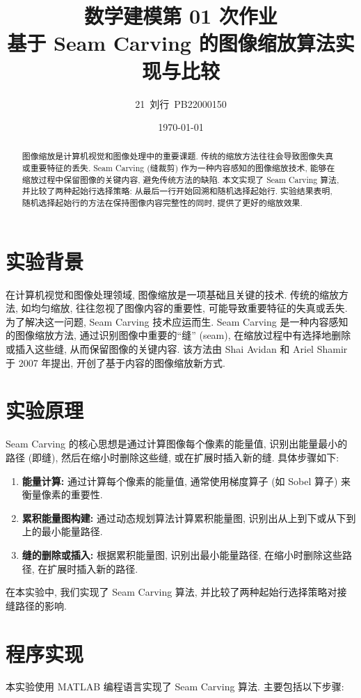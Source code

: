 \documentclass[12pt]{article}
\title{数学建模第 01 次作业\\\small{基于 Seam Carving 的图像缩放算法实现与比较}}
\author{21~刘行~PB22000150}
\date{\today}
\begin{document}
\maketitle

	\begin{abstract}
		\noindent
		图像缩放是计算机视觉和图像处理中的重要课题. 传统的缩放方法往往会导致图像失真或重要特征的丢失. Seam Carving (缝裁剪) 作为一种内容感知的图像缩放技术, 能够在缩放过程中保留图像的关键内容, 避免传统方法的缺陷. 本文实现了 Seam Carving 算法, 并比较了两种起始行选择策略: 从最后一行开始回溯和随机选择起始行. 实验结果表明, 随机选择起始行的方法在保持图像内容完整性的同时, 提供了更好的缩放效果.
	\end{abstract}

	\section{实验背景}
		\noindent
		在计算机视觉和图像处理领域, 图像缩放是一项基础且关键的技术. 传统的缩放方法, 如均匀缩放, 往往忽视了图像内容的重要性, 可能导致重要特征的失真或丢失. 为了解决这一问题, Seam Carving 技术应运而生. Seam Carving 是一种内容感知的图像缩放方法, 通过识别图像中重要的``缝'' (seam), 在缩放过程中有选择地删除或插入这些缝, 从而保留图像的关键内容. 该方法由 Shai Avidan 和 Ariel Shamir 于 2007 年提出, 开创了基于内容的图像缩放新方式.

	\section{实验原理}
		\noindent
		Seam Carving 的核心思想是通过计算图像每个像素的能量值, 识别出能量最小的路径 (即缝), 然后在缩小时删除这些缝, 或在扩展时插入新的缝. 具体步骤如下:

		\begin{enumerate}
			\item \textbf{能量计算:} 通过计算每个像素的能量值, 通常使用梯度算子 (如 Sobel 算子) 来衡量像素的重要性.
			\item \textbf{累积能量图构建:} 通过动态规划算法计算累积能量图, 识别出从上到下或从下到上的最小能量路径.
			\item \textbf{缝的删除或插入:} 根据累积能量图, 识别出最小能量路径, 在缩小时删除这些路径, 在扩展时插入新的路径.
		\end{enumerate}

		\noindent
		在本实验中, 我们实现了 Seam Carving 算法, 并比较了两种起始行选择策略对接缝路径的影响.

	\section{程序实现}
		\noindent
		本实验使用 MATLAB 编程语言实现了 Seam Carving 算法. 主要包括以下步骤:
\end{document}
